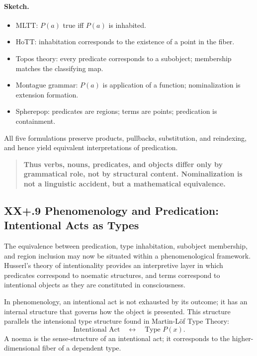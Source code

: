 \documentclass[12pt,letterpaper]{article}
\begin{document}
\paragraph{Sketch.}
\begin{itemize}
    \item MLTT: $P(a)$ true iff $P(a)$ is inhabited.
    \item HoTT: inhabitation corresponds to the existence of a point in the
    fiber.
    \item Topos theory: every predicate corresponds to a subobject; membership
    matches the classifying map.
    \item Montague grammar: $P(a)$ is application of a function; nominalization
    is extension formation.
    \item Spherepop: predicates are regions; terms are points; predication is
    containment.
\end{itemize}

All five formulations preserve products, pullbacks, substitution, and
reindexing, and hence yield equivalent interpretations of predication.

\begin{quote}
\textbf{Thus verbs, nouns, predicates, and objects differ only by grammatical
role, not by structural content.  Nominalization is not a linguistic accident,
but a mathematical equivalence.}
\end{quote}

\subsection{XX+.9 Phenomenology and Predication: Intentional Acts as Types}

The equivalence between predication, type inhabitation, subobject membership,
and region inclusion may now be situated within a phenomenological framework.
Husserl’s theory of intentionality provides an interpretive layer in which
predicates correspond to noematic structures, and terms correspond to intentional
objects as they are constituted in consciousness.

In phenomenology, an intentional act is not exhausted by its outcome; it has an
internal structure that governs how the object is presented.  This structure
parallels the intensional type structure found in Martin-Löf Type Theory:
\[
\text{Intentional Act} \quad\longleftrightarrow\quad \text{Type } P(x).
\]
A noema is the sense-structure of an intentional act; it corresponds to the
higher-dimensional fiber of a dependent type.
\end{document}
